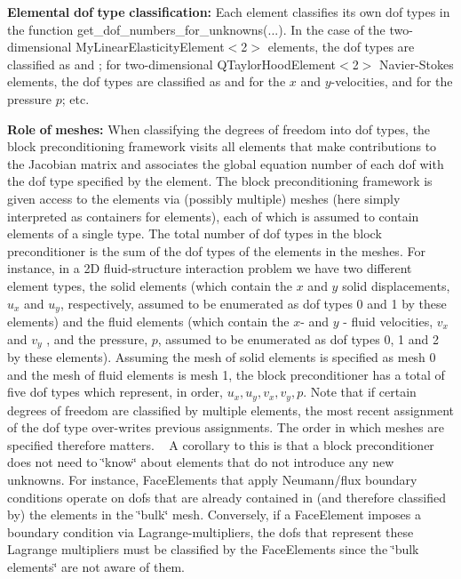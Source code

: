 \begin{DoxyItemize}
\item {\bfseries Elemental} {\bfseries dof} {\bfseries type} {\bfseries classification\+:} Each element classifies its own dof types in the function {\ttfamily get\+\_\+dof\+\_\+numbers\+\_\+for\+\_\+unknowns}(...). In the case of the two-\/dimensional {\ttfamily My\+Linear\+Elasticity\+Element$<$2$>$} elements, the dof types are classified as {} and {}; for two-\/dimensional {\ttfamily Q\+Taylor\+Hood\+Element$<$2$>$} Navier-\/\+Stokes elements, the dof types are classified as {} and {} for the $ x $ and $y $-\/velocities, and {} for the pressure $ p $; etc. ~\newline
~\newline

\item {\bfseries Role} {\bfseries of} {\bfseries meshes\+:} When classifying the degrees of freedom into dof types, the block preconditioning framework visits all elements that make contributions to the Jacobian matrix and associates the global equation number of each dof with the dof type specified by the element. The block preconditioning framework is given access to the elements via (possibly multiple) meshes (here simply interpreted as containers for elements), each of which is assumed to contain elements of a single type. The total number of dof types in the block preconditioner is the sum of the dof types of the elements in the meshes. For instance, in a 2D fluid-\/structure interaction problem we have two different element types, the solid elements (which contain the $ x $ and $ y$ solid displacements, $ u_x $ and $ u_y $, respectively, assumed to be enumerated as dof types 0 and 1 by these elements) and the fluid elements (which contain the $ x $-\/ and $ y $ -\/ fluid velocities, $ v_x $ and $ v_y $ , and the pressure, $ p $, assumed to be enumerated as dof types 0, 1 and 2 by these elements). Assuming the mesh of solid elements is specified as mesh 0 and the mesh of fluid elements is mesh 1, the block preconditioner has a total of five dof types which represent, in order, $ u_x, u_y, v_x, v_y, p$. Note that if certain degrees of freedom are classified by multiple elements, the most recent assignment of the dof type over-\/writes previous assignments. The order in which meshes are specified therefore matters. ~\newline
 A corollary to this is that a block preconditioner does not need to \char`\"{}know\char`\"{} about elements that do not introduce any new unknowns. For instance, {\ttfamily Face\+Elements} that apply Neumann/flux boundary conditions operate on dofs that are already contained in (and therefore classified by) the elements in the \char`\"{}bulk\char`\"{} mesh. Conversely, if a {\ttfamily Face\+Element} imposes a boundary condition via Lagrange-\/multipliers, the dofs that represent these Lagrange multipliers must be classified by the {\ttfamily Face\+Elements} since the \char`\"{}bulk elements\char`\"{} are not aware of them. ~\newline

\end{DoxyItemize}
